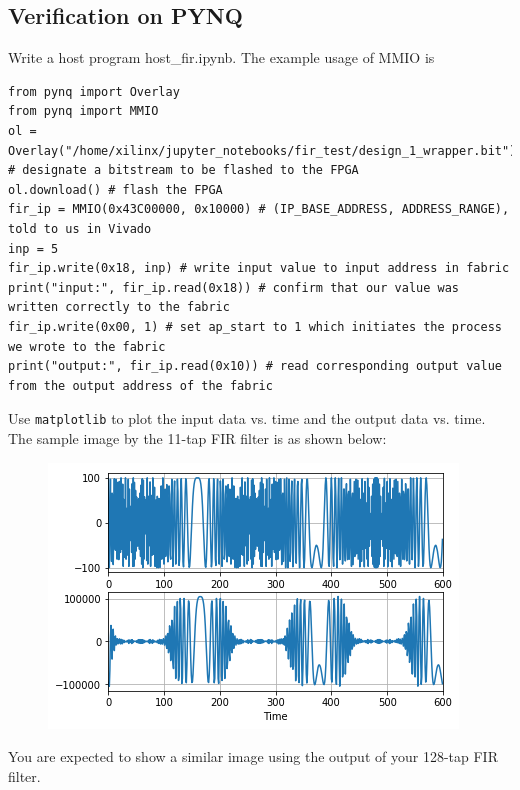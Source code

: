 \documentclass[a4paper,12pt,twoside]{article}
\begin{document}
\subsection{Verification on PYNQ}
Write a host program host\_fir.ipynb. The example usage of MMIO is
\begin{verbatim}
from pynq import Overlay
from pynq import MMIO
ol = Overlay("/home/xilinx/jupyter_notebooks/fir_test/design_1_wrapper.bit") # designate a bitstream to be flashed to the FPGA
ol.download() # flash the FPGA
fir_ip = MMIO(0x43C00000, 0x10000) # (IP_BASE_ADDRESS, ADDRESS_RANGE), told to us in Vivado
inp = 5
fir_ip.write(0x18, inp) # write input value to input address in fabric
print("input:", fir_ip.read(0x18)) # confirm that our value was written correctly to the fabric
fir_ip.write(0x00, 1) # set ap_start to 1 which initiates the process we wrote to the fabric
print("output:", fir_ip.read(0x10)) # read corresponding output value from the output address of the fabric
\end{verbatim}
Use \texttt{matplotlib} to plot the input data vs. time and the output data vs. time. The sample image by the 11-tap FIR filter is as shown below:
\begin{figure}[H]
    \centering
    \includegraphics[width=\textwidth]{images/28.png}
\end{figure}
You are expected to show a similar image using the output of your 128-tap FIR filter.

\newpage
\end{document}
